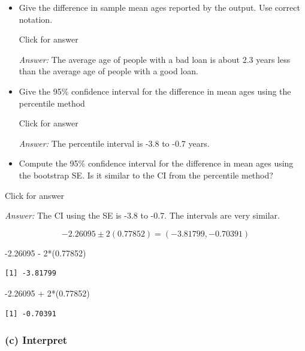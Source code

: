 \documentclass[
]{book}
\newenvironment{Shaded}{\begin{snugshade}}{\end{snugshade}}
\newcommand{\DecValTok}[1]{\textcolor[rgb]{0.00,0.00,0.81}{#1}}
\newcommand{\FloatTok}[1]{\textcolor[rgb]{0.00,0.00,0.81}{#1}}
\newcommand{\NormalTok}[1]{#1}
\newcommand{\SpecialCharTok}[1]{\textcolor[rgb]{0.00,0.00,0.00}{#1}}
\providecommand{\tightlist}{%
  \setlength{\itemsep}{0pt}\setlength{\parskip}{0pt}}
\begin{document}
\begin{itemize}
\tightlist
\item
  Give the difference in sample mean ages reported by the output. Use correct notation.

  Click for answer

  \emph{Answer:} The average age of people with a bad loan is about 2.3 years less than the average age of people with a good loan.
\item
  Give the 95\% confidence interval for the difference in mean ages using the percentile method

  Click for answer

  \emph{Answer:} The percentile interval is -3.8 to -0.7 years.
\item
  Compute the 95\% confidence interval for the difference in mean ages using the bootstrap SE. Is it similar to the CI from the percentile method?
\end{itemize}

Click for answer

\emph{Answer:} The CI using the SE is -3.8 to -0.7. The intervals are very similar.

\[
-2.26095 \pm 2(0.77852) = (-3.81799,  -0.70391)
\]

\begin{Shaded}
\begin{Highlighting}[]
\SpecialCharTok{{-}}\FloatTok{2.26095} \SpecialCharTok{{-}} \DecValTok{2}\SpecialCharTok{*}\NormalTok{(}\FloatTok{0.77852}\NormalTok{)}
\end{Highlighting}
\end{Shaded}

\begin{verbatim}
[1] -3.81799
\end{verbatim}

\begin{Shaded}
\begin{Highlighting}[]
\SpecialCharTok{{-}}\FloatTok{2.26095} \SpecialCharTok{+} \DecValTok{2}\SpecialCharTok{*}\NormalTok{(}\FloatTok{0.77852}\NormalTok{)}
\end{Highlighting}
\end{Shaded}

\begin{verbatim}
[1] -0.70391
\end{verbatim}

\hypertarget{c-interpret}{%
\subsubsection{(c) Interpret}\label{c-interpret}}
\end{document}
